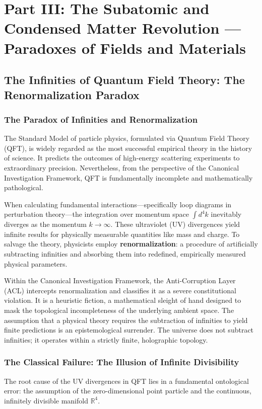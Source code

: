 \documentclass[12pt,twoside]{extbook}
\theoremstyle{definition}
\theoremstyle{remark}
\newcommand{\term}[1]{\textcolor{brandPrimary}{\textbf{#1}}}
\begin{document}
\part*{Part III: The Subatomic and Condensed Matter Revolution --- Paradoxes of Fields and Materials}

\chapter{The Infinities of Quantum Field Theory: The Renormalization Paradox}

\section{The Paradox of Infinities and Renormalization}
The Standard Model of particle physics, formulated via Quantum Field Theory (QFT), is widely regarded as the most successful empirical theory in the history of science. It predicts the outcomes of high-energy scattering experiments to extraordinary precision. Nevertheless, from the perspective of the Canonical Investigation Framework, QFT is fundamentally incomplete and mathematically pathological. 

When calculating fundamental interactions—specifically loop diagrams in perturbation theory—the integration over momentum space $\int d^4k$ inevitably diverges as the momentum $k \to \infty$. These ultraviolet (UV) divergences yield infinite results for physically measurable quantities like mass and charge. To salvage the theory, physicists employ \term{renormalization}: a procedure of artificially subtracting infinities and absorbing them into redefined, empirically measured physical parameters.

Within the Canonical Investigation Framework, the Anti-Corruption Layer (ACL) intercepts renormalization and classifies it as a severe constitutional violation. It is a heuristic fiction, a mathematical sleight of hand designed to mask the topological incompleteness of the underlying ambient space. The assumption that a physical theory requires the subtraction of infinities to yield finite predictions is an epistemological surrender. The universe does not subtract infinities; it operates within a strictly finite, holographic topology.

\section{The Classical Failure: The Illusion of Infinite Divisibility}
The root cause of the UV divergences in QFT lies in a fundamental ontological error: the assumption of the zero-dimensional point particle and the continuous, infinitely divisible manifold $\mathbb{R}^4$. 
\end{document}
